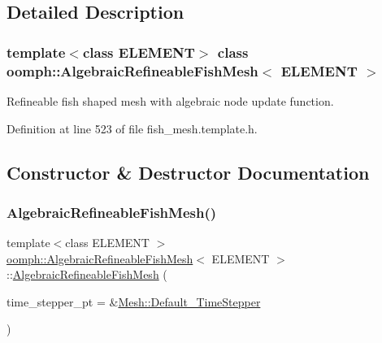 \subsection{Detailed Description}
\subsubsection*{template$<$class E\+L\+E\+M\+E\+NT$>$\newline
class oomph\+::\+Algebraic\+Refineable\+Fish\+Mesh$<$ E\+L\+E\+M\+E\+N\+T $>$}

Refineable fish shaped mesh with algebraic node update function. 

Definition at line 523 of file fish\+\_\+mesh.\+template.\+h.



\subsection{Constructor \& Destructor Documentation}
\mbox{\label{classoomph_1_1AlgebraicRefineableFishMesh_afe4643b107e47fbad0c8836bc0516518}} 
\subsubsection{\texorpdfstring{Algebraic\+Refineable\+Fish\+Mesh()}{AlgebraicRefineableFishMesh()}\hspace{0.1cm}{\footnotesize\ttfamily [1/2]}}
{\footnotesize\ttfamily template$<$class E\+L\+E\+M\+E\+NT $>$ \\
\hyperlink{classoomph_1_1AlgebraicRefineableFishMesh}{oomph\+::\+Algebraic\+Refineable\+Fish\+Mesh}$<$ E\+L\+E\+M\+E\+NT $>$\+::\hyperlink{classoomph_1_1AlgebraicRefineableFishMesh}{Algebraic\+Refineable\+Fish\+Mesh} (\begin{DoxyParamCaption}\item[{\hyperlink{classoomph_1_1TimeStepper}{Time\+Stepper} $\ast$}]{time\+\_\+stepper\+\_\+pt = {\ttfamily \&\hyperlink{classoomph_1_1Mesh_a12243d0fee2b1fcee729ee5a4777ea10}{Mesh\+::\+Default\+\_\+\+Time\+Stepper}} }\end{DoxyParamCaption})\hspace{0.3cm}{\ttfamily [inline]}}

